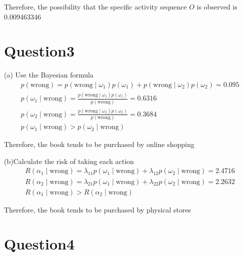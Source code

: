 \documentclass{article}
\begin{document}
Therefore, the possibility that the specific activity sequence $O$ is observed is 0.009463346

\section*{Question3}

(a) Use the Bayesian formula
\begin{gather*}
    p(\mathrm{wrong}) = p(\mathrm{wrong} \mid \omega_{1}) p(\omega_{1}) +
                        p(\mathrm{wrong} \mid \omega_{2}) p(\omega_{2}) = 0.095 \\[5mm]
    p(\omega_{1} \mid \mathrm{wrong}) = 
    \frac{p(\mathrm{wrong} \mid \omega_{1}) p(\omega_{1})}{p(\mathrm{wrong})} = 0.6316 \\[5mm]
    p(\omega_{2} \mid \mathrm{wrong}) = 
    \frac{p(\mathrm{wrong} \mid \omega_{2}) p(\omega_{2})}{p(\mathrm{wrong})} = 0.3684 \\[5mm]
    p(\omega_{1} \mid \mathrm{wrong}) > p(\omega_{2} \mid \mathrm{wrong})
\end{gather*}

Therefore, the book tends to be purchased by online shopping

(b)Calculate the risk of taking each action
\begin{gather*}
    R(\alpha_{1} \mid \mathrm{wrong}) = \lambda_{11} p(\omega_{1} \mid \mathrm{wrong}) +
     \lambda_{12} p(\omega_{2} \mid \mathrm{wrong}) = 2.4716 \\[5mm]
    R(\alpha_{2} \mid \mathrm{wrong}) = \lambda_{21} p(\omega_{1} \mid \mathrm{wrong}) + 
    \lambda_{22} p(\omega_{2} \mid \mathrm{wrong}) = 2.2632 \\[5mm]
    R(\alpha_{1} \mid \mathrm{wrong}) > R(\alpha_{2} \mid \mathrm{wrong})
\end{gather*}

Therefore, the book tends to be purchased by physical stores

\section*{Question4}
\end{document}

